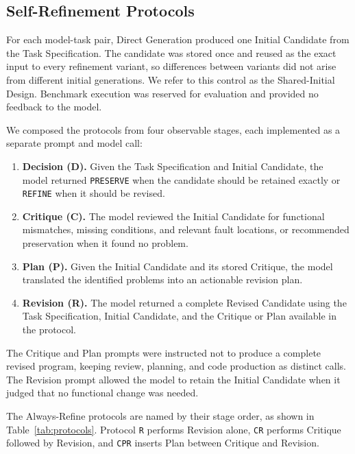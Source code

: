 \subsection{Self-Refinement Protocols}

For each model-task pair, Direct Generation produced one Initial Candidate from the Task Specification.
The candidate was stored once and reused as the exact input to every refinement variant, so differences between variants did not arise from different initial generations.
We refer to this control as the Shared-Initial Design.
Benchmark execution was reserved for evaluation and provided no feedback to the model.

We composed the protocols from four observable stages, each implemented as a separate prompt and model call:

\begin{enumerate}
    \item \textbf{Decision (D).} Given the Task Specification and Initial Candidate, the model returned \texttt{PRESERVE} when the candidate should be retained exactly or \texttt{REFINE} when it should be revised.
    \item \textbf{Critique (C).} The model reviewed the Initial Candidate for functional mismatches, missing conditions, and relevant fault locations, or recommended preservation when it found no problem.
    \item \textbf{Plan (P).} Given the Initial Candidate and its stored Critique, the model translated the identified problems into an actionable revision plan.
    \item \textbf{Revision (R).} The model returned a complete Revised Candidate using the Task Specification, Initial Candidate, and the Critique or Plan available in the protocol.
\end{enumerate}

The Critique and Plan prompts were instructed not to produce a complete revised program, keeping review, planning, and code production as distinct calls.
The Revision prompt allowed the model to retain the Initial Candidate when it judged that no functional change was needed.

The Always-Refine protocols are named by their stage order, as shown in Table~\ref{tab:protocols}.
Protocol \texttt{R} performs Revision alone, \texttt{CR} performs Critique followed by Revision, and \texttt{CPR} inserts Plan between Critique and Revision.

